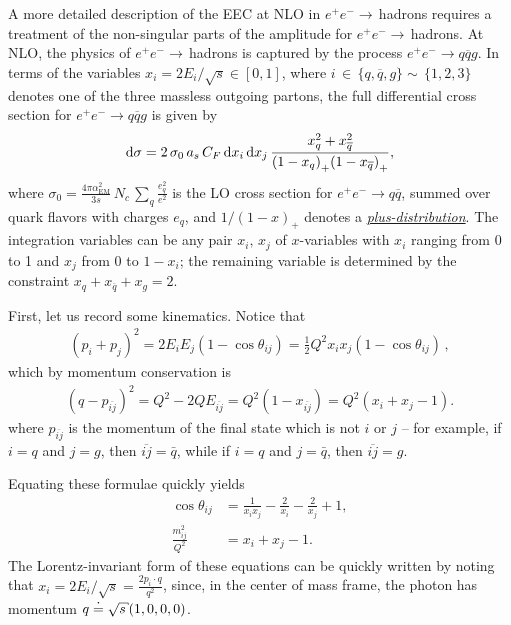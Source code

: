 
A more detailed description of the EEC at NLO in \(e^+e^-\to\,\)hadrons requires a treatment of the non-singular parts of the amplitude for \(e^+ e^- \to\,\)hadrons.
%
At NLO, the physics of \(e^+ e^- \to\,\)hadrons is captured by the process \(e^+ e^- \to q \overline{q} g\).
%
In terms of the variables \(x_i = 2 E_i / \sqrt{s} \in [0, 1]\), where \(i\,\in\,\{q,\overline{q},g\}\sim\,\{1,2,3\}\) denotes one of the three massless outgoing partons, the full differential cross section for \(e^+e^-\to q \overline{q} g\) is given by
\begin{align}
    \dd \sigma
    =
    2\,\sigma_0
    \,
    a_s \, C_F
    \,
    \dd x_i\,\dd x_j
    \,
    \frac{x_q^2 + x_{\overline{q}}^2}{
          {(1-x_q)}_+
          {(1-x_{\overline{q}})}_+
    }
    ,
\end{align}
where \(
    \sigma_0 =
    \frac{4\pi \alpha_{\text{EM}}^2}{3 s}
    \,N_c\,\sum_q \frac{e_q^2}{e^2}
\)
is the LO cross section for \(e^+e^-\to q \overline{q}\), summed over quark flavors with charges \(e_q\), and \(1/{(1-x)}_+\) denotes a \hyperlink{footnote:plusfn_defn}{\textit{plus-distribution}}.
%
The integration variables can be any pair \(x_i,\,x_j\) of \(x\)-variables with \(x_i\) ranging from 0 to 1 and \(x_j\) from 0 to \(1-x_i\);
%
the remaining variable is determined by the constraint \(x_q + x_{\overline{q}} + x_g = 2\).


First, let us record some kinematics.
%
Notice that
\begin{align}
    (p_i + p_j)^2 = 2 E_i E_j (1 - \cos\theta_{ij}) = \frac{1}{2}Q^2 x_i x_j (1 - \cos\theta_{ij})
    \,,
\end{align}
which by momentum conservation is
\begin{align}
    (q - p_{\overline{ij}})^2 = Q^2 - 2 Q E_{\overline{ij}} = Q^2(1 - x_{\overline{ij}}) = Q^2(x_i + x_j - 1).
\end{align}
where \(p_{\overline{ij}}\) is the momentum of the final state which is not \(i\) or \(j\)
%
--
%
for example, if \(i=q\) and \(j = g\), then \(\overline{ij} = \bar{q}\), while if \(i=q\) and \(j = \bar{q}\), then \(\overline{ij} = g\).

Equating these formulae quickly yields
\begin{align}
    \cos\theta_{ij} &= \frac{1}{x_i x_j} - \frac{2}{x_i} - \frac{2}{x_j} + 1
    ,
    \\
    \frac{m^2_{ij}}{Q^2} &= x_i + x_j - 1
    .
\end{align}
%
The Lorentz-invariant form of these equations can be quickly written by noting that \(x_i = 2 E_i/\sqrt{s} = \frac{2 p_i\cdot q}{q^2}\), since, in the center of mass frame, the photon has momentum \(q \reppedby \sqrt{s}(1,0,0,0)\).


